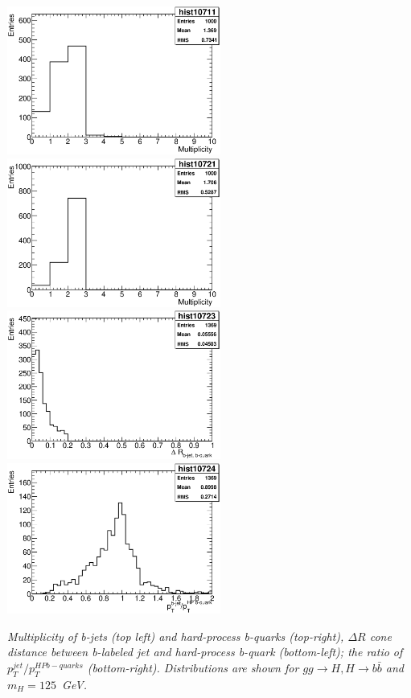 \begin{Fighere}
\begin{center}
{
   \includegraphics[width=7.0cm,angle=0]{plot-multiBJets.eps}
   \includegraphics[width=7.0cm,angle=0]{plot-multiBquark.eps}\\
}
{
   \includegraphics[width=7.0cm,angle=0]{plot-dR-bjetHPparton.eps}
   \includegraphics[width=7.0cm,angle=0]{plot-dPT-bjetHPparton.eps}
}
\end{center}
\caption{\em
Multiplicity of b-jets (top left) and hard-process b-quarks (top-right),
$\Delta R$ cone distance between b-labeled jet and hard-process b-quark (bottom-left);
the ratio of $p_T^{jet}/p_T^{HP b-quarks}$ (bottom-right). Distributions are shown
for $gg \to H, H \to b \bar b$ and  $m_{H} = 125$~GeV.
\label{FS2:5}} 
\end{Fighere}


